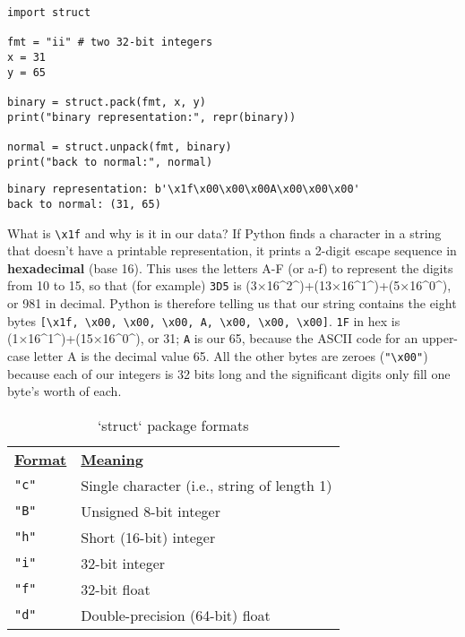 \documentclass{scrbook}
\newcommand{\glossref}[1]{\textbf{#1}}
\begin{document}
\begin{lstlisting}[frame=single,frameround=tttt]
import struct

fmt = "ii" # two 32-bit integers
x = 31
y = 65

binary = struct.pack(fmt, x, y)
print("binary representation:", repr(binary))

normal = struct.unpack(fmt, binary)
print("back to normal:", normal)
\end{lstlisting}



\begin{lstlisting}[frame=single,frameround=tttt]
binary representation: b'\x1f\x00\x00\x00A\x00\x00\x00'
back to normal: (31, 65)
\end{lstlisting}



What is \texttt{{\textbackslash}x1f} and why is it in our data?
If Python finds a character in a string that doesn't have a printable representation,
it prints a 2-digit escape sequence in \glossref{hexadecimal} (base 16).
This uses the letters A-F (or a-f) to represent the digits from 10 to 15,
so that (for example) \texttt{3D5} is (3×16{\textasciicircum}2{\textasciicircum})+(13×16{\textasciicircum}1{\textasciicircum})+(5×16{\textasciicircum}0{\textasciicircum}), or 981 in decimal.
Python is therefore telling us that
our string contains the eight bytes
\texttt{[{\textquotesingle}{\textbackslash}x1f{\textquotesingle}, {\textquotesingle}{\textbackslash}x00{\textquotesingle}, {\textquotesingle}{\textbackslash}x00{\textquotesingle}, {\textquotesingle}{\textbackslash}x00{\textquotesingle}, {\textquotesingle}A{\textquotesingle}, {\textquotesingle}{\textbackslash}x00{\textquotesingle}, {\textquotesingle}{\textbackslash}x00{\textquotesingle}, {\textquotesingle}{\textbackslash}x00{\textquotesingle}]}.
\texttt{1F} in hex is (1×16{\textasciicircum}1{\textasciicircum})+(15×16{\textasciicircum}0{\textasciicircum}), or 31;
\texttt{{\textquotesingle}A{\textquotesingle}} is our 65,
because the ASCII code for an upper-case letter A is the decimal value 65.
All the other bytes are zeroes (\texttt{"{\textbackslash}x00"})
because each of our integers is 32 bits long
and the significant digits only fill one byte's worth of each.

\begin{table}
\begin{tabular}{ll}
\textbf{\underline{Format}} & \textbf{\underline{Meaning}} \\
\texttt{"c"} & Single character (i.e., string of length 1) \\
\texttt{"B"} & Unsigned 8-bit integer \\
\texttt{"h"} & Short (16-bit) integer \\
\texttt{"i"} & 32-bit integer \\
\texttt{"f"} & 32-bit float \\
\texttt{"d"} & Double-precision (64-bit) float \\
\end{tabular}
\caption{`struct` package formats}
\label{binary-formats}
\end{table}
\end{document}
